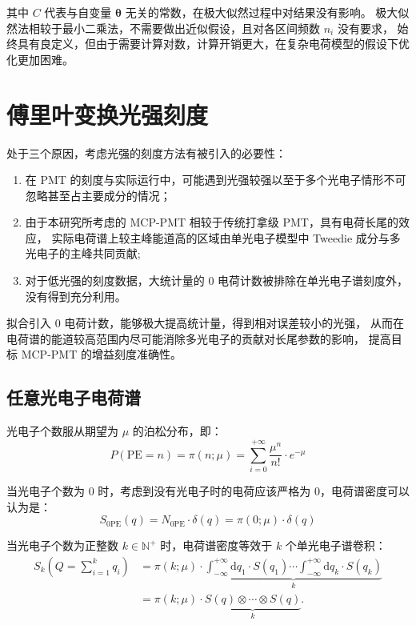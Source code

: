 其中 $C$ 代表与自变量 $\boldsymbol{\theta}$ 无关的常数，在极大似然过程中对结果没有影响。
极大似然法相较于最小二乘法，不需要做出近似假设，且对各区间频数 $n_i$ 没有要求，
始终具有良定义，但由于需要计算对数，计算开销更大，在复杂电荷模型的假设下优化更加困难。

\section{傅里叶变换光强刻度}\label{sec:fourier}

处于三个原因，考虑光强的刻度方法有被引入的必要性：
\begin{enumerate}
    \item 在 PMT 的刻度与实际运行中，可能遇到光强较强以至于多个光电子情形不可忽略甚至占主要成分的情况；
    \item 由于本研究所考虑的 MCP-PMT 相较于传统打拿级 PMT，具有电荷长尾的效应，
    实际电荷谱上较主峰能道高的区域由单光电子模型中 Tweedie 成分与多光电子的主峰共同贡献;
    \item 对于低光强的刻度数据，大统计量的 0 电荷计数被排除在单光电子谱刻度外，没有得到充分利用。
\end{enumerate}

拟合引入 0 电荷计数，能够极大提高统计量，得到相对误差较小的光强，
从而在电荷谱的能道较高范围内尽可能消除多光电子的贡献对长尾参数的影响，
提高目标 MCP-PMT 的增益刻度准确性。

\subsection{任意光电子电荷谱}\label{sec:dft}

光电子个数服从期望为 $\mu$ 的泊松分布，即：
\begin{equation}
    P(\text{PE}=n) = \pi(n;\mu)=\sum_{i=0}^{+\infty}\frac{\mu^{n}}{n!}\cdot e^{-\mu}
\end{equation}

当光电子个数为 0 时，考虑到没有光电子时的电荷应该严格为 0，电荷谱密度可以认为是：
\begin{equation}
    S_{0\text{PE}}(q)=N_{0\text{PE}}\cdot\delta(q)=\pi(0;\mu)\cdot\delta(q)
\end{equation}

当光电子个数为正整数 $k\in\mathbb{N}^{+}$ 时，电荷谱密度等效于 $k$ 个单光电子谱卷积：
\begin{equation}
    \begin{aligned}
        S_{k}(Q = \sum_{i = 1}^{k} q_i ) 
        & = \pi(k;\mu)\cdot\underbrace{
        \int_{-\infty }^{+\infty}\mathrm{d}q_1\cdot S(q_1)
        \cdots \int_{-\infty }^{+\infty}\mathrm{d}q_k\cdot S(q_k)
        }_{k}\\
        &=\pi(k;\mu)\cdot\underbrace{S(q)\otimes\cdots\otimes S(q)}_{k}.
    \end{aligned}
    \label{eq:kpe-charge}
\end{equation}

